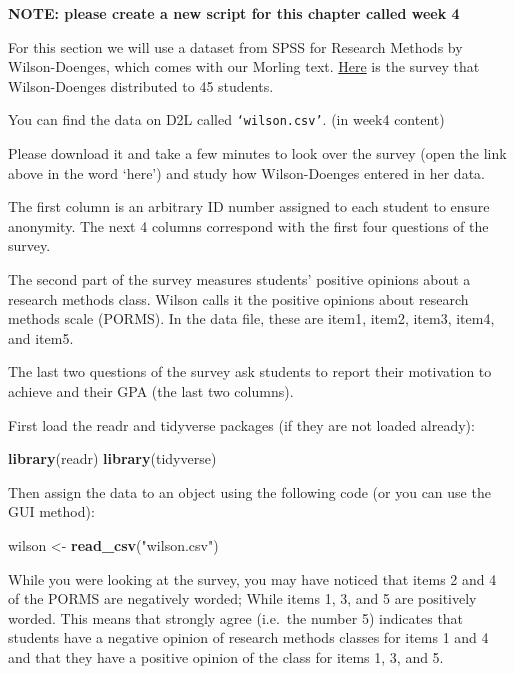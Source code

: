 \documentclass[
]{book}
\newenvironment{Shaded}{\begin{snugshade}}{\end{snugshade}}
\newcommand{\KeywordTok}[1]{\textcolor[rgb]{0.13,0.29,0.53}{\textbf{#1}}}
\newcommand{\NormalTok}[1]{#1}
\newcommand{\StringTok}[1]{\textcolor[rgb]{0.31,0.60,0.02}{#1}}
\begin{document}
\textbf{NOTE: please create a new script for this chapter called week 4}

For this section we will use a dataset from SPSS for Research Methods by Wilson-Doenges, which comes with our Morling text. \href{https://docs.google.com/document/d/1V1vHljcqtVYXE-2iHcdcR0FNzjdCmJXc6Je5TuWMPuk/edit?usp=sharing}{Here} is the survey that Wilson-Doenges distributed to 45 students.

You can find the data on D2L called \texttt{‘wilson.csv’}. (in week4 content)

Please download it and take a few minutes to look over the survey (open the link above in the word `here') and study how Wilson-Doenges entered in her data.

The first column is an arbitrary ID number assigned to each student to ensure anonymity. The next 4 columns correspond with the first four questions of the survey.

The second part of the survey measures students' positive opinions about a research methods class. Wilson calls it the positive opinions about research methods scale (PORMS). In the data file, these are item1, item2, item3, item4, and item5.

The last two questions of the survey ask students to report their motivation to achieve and their GPA (the last two columns).

First load the readr and tidyverse packages (if they are not loaded already):

\begin{Shaded}
\begin{Highlighting}[]
\KeywordTok{library}\NormalTok{(readr)}
\KeywordTok{library}\NormalTok{(tidyverse)}
\end{Highlighting}
\end{Shaded}

Then assign the data to an object using the following code (or you can use the GUI method):

\begin{Shaded}
\begin{Highlighting}[]
\NormalTok{wilson <-}\StringTok{ }\KeywordTok{read_csv}\NormalTok{(}\StringTok{"wilson.csv"}\NormalTok{) }
\end{Highlighting}
\end{Shaded}

While you were looking at the survey, you may have noticed that items 2 and 4 of the PORMS are negatively worded; While items 1, 3, and 5 are positively worded. This means that strongly agree (i.e.~the number 5) indicates that students have a negative opinion of research methods classes for items 1 and 4 and that they have a positive opinion of the class for items 1, 3, and 5.
\end{document}
